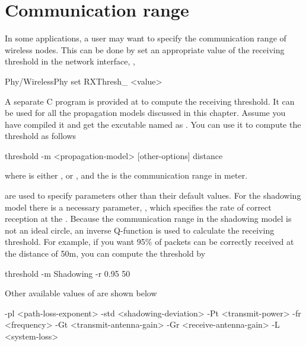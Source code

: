 
\section{Communication range}
\label{sec:commrange}

In some applications, a user may want to specify the communication range of
wireless nodes. This can be done by set an appropriate value of the receiving
threshold in the network interface, \ie,

\begin{program}
Phy/WirelessPhy set RXThresh_ <value>
\end{program}

A separate C program is provided at 
to compute the receiving threshold. It can be used for all the
propagation models discussed in this chapter. Assume you have compiled it and get
the excutable named as . You can use it to compute the threshold
as follows

\begin{program}
threshold -m <propagation-model> [other-options] distance
\end{program}

where  is either , 
or , and the  is the communication range in meter.

 are used to specify parameters other than their
default values. For the shadowing model there is a necessary parameter,
, which specifies the rate of correct reception at the
. Because the communication range in the shadowing model is not
an ideal circle, an inverse Q-function \cite{Rappaport96} is used to calculate the
receiving threshold. For example, if you want 95\% of packets can be correctly
received at the distance of 50m, you can compute the threshold by

\begin{program}
threshold -m Shadowing -r 0.95 50
\end{program}

Other available values of  are shown below

\begin{program}
-pl <path-loss-exponent> -std <shadowing-deviation> -Pt <transmit-power>
-fr <frequency> -Gt <transmit-antenna-gain> -Gr <receive-antenna-gain>
-L <system-loss>
\end{program}

